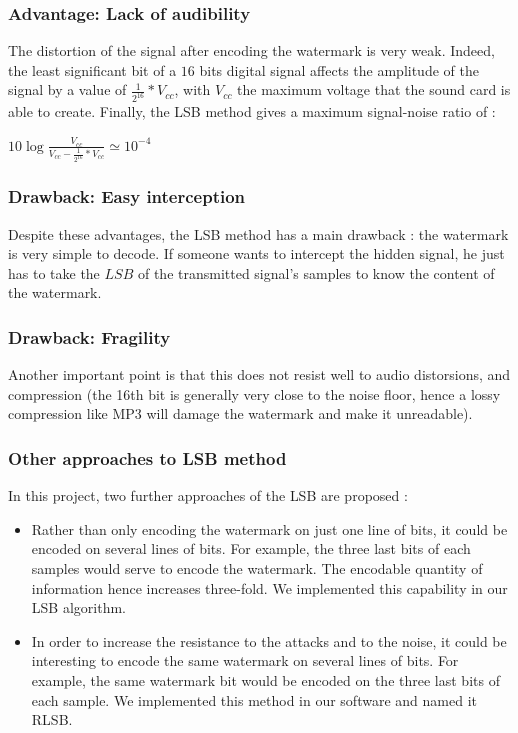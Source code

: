 \subsubsection{Advantage: Lack of audibility}
The distortion of the signal after encoding the watermark is very weak. Indeed, the least significant bit of a $16$ bits digital signal affects the amplitude of the signal by a value of $\displaystyle\frac{1}{2^{16}} * V_{cc}$\cite{kester2005data}, with $V_{cc}$ the maximum voltage that the sound card is able to create.
Finally, the LSB method gives a maximum signal-noise ratio of : 
 
\begin{center}
\begin{math}
10 \log \displaystyle\frac{V_{cc}}{V_{cc} - \displaystyle\frac{1}{2^{16}} * V_{cc}} \simeq 10^{-4}
\end{math}
\end{center}

\subsubsection{Drawback: Easy interception}
Despite these advantages, the LSB method has a main drawback : the watermark is very simple to decode. If someone wants to intercept the hidden signal, he just has to take the $LSB$ of the transmitted signal's samples to know the content of the watermark.  

\subsubsection{Drawback: Fragility}
Another important point is that this does not resist well to audio distorsions, and compression (the 16th bit is generally very close to the noise floor, hence a lossy compression like MP3 will damage the watermark and make it unreadable). 

\subsubsection{Other approaches to LSB method}
In this project, two further approaches of the \ac{LSB} are proposed :
\begin{itemize}
\item Rather than only encoding the watermark on just one line of bits, it could be encoded on several lines of bits. For example, the three last bits of each samples would serve to encode the watermark. The encodable quantity of information hence increases three-fold. We implemented this capability in our \ac{LSB} algorithm.
\item In order to increase the resistance to the attacks and to the noise, it could be interesting to encode the same watermark on several lines of bits. For example, the same watermark bit would be encoded on the three last bits of each sample. We implemented this method in our software and named it \ac{RLSB}.
\end{itemize} 

